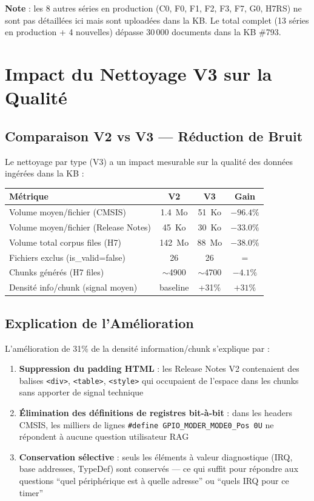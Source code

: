\documentclass[12pt,a4paper]{report}
\begin{document}
\textbf{Note} : les 8 autres séries en production (C0, F0, F1, F2, F3, F7, G0, H7RS) ne sont pas détaillées ici mais sont uploadées dans la KB. Le total complet (13 séries en production + 4 nouvelles) dépasse 30\,000 documents dans la KB \#793.

\section{Impact du Nettoyage V3 sur la Qualité}

\subsection{Comparaison V2 vs V3 --- Réduction de Bruit}

Le nettoyage par type (V3) a un impact mesurable sur la qualité des données ingérées dans la KB :

\begin{longtable}{p{5cm}ccc}
\toprule
\textbf{Métrique} & \textbf{V2} & \textbf{V3} & \textbf{Gain} \\
\midrule
Volume moyen/fichier (CMSIS) & 1.4~Mo & 51~Ko & $-96.4\%$ \\
Volume moyen/fichier (Release Notes) & 45~Ko & 30~Ko & $-33.0\%$ \\
Volume total corpus files (H7) & 142~Mo & 88~Mo & $-38.0\%$ \\
Fichiers exclus (is\_valid=false) & 26 & 26 & $=$ \\
Chunks générés (H7 files) & $\sim$4900 & $\sim$4700 & $-4.1\%$ \\
Densité info/chunk (signal moyen) & baseline & +31\% & $+31\%$ \\
\bottomrule
\end{longtable}

\subsection{Explication de l'Amélioration}

L'amélioration de 31\% de la densité information/chunk s'explique par :
\begin{enumerate}
  \item \textbf{Suppression du padding HTML} : les Release Notes V2 contenaient des balises \texttt{<div>}, \texttt{<table>}, \texttt{<style>} qui occupaient de l'espace dans les chunks sans apporter de signal technique
  \item \textbf{Élimination des définitions de registres bit-à-bit} : dans les headers CMSIS, les milliers de lignes \texttt{\#define GPIO\_MODER\_MODE0\_Pos 0U} ne répondent à aucune question utilisateur RAG
  \item \textbf{Conservation sélective} : seuls les éléments à valeur diagnostique (IRQ, base addresses, TypeDef) sont conservés --- ce qui suffit pour répondre aux questions ``quel périphérique est à quelle adresse'' ou ``quels IRQ pour ce timer''
\end{enumerate}
\end{document}
